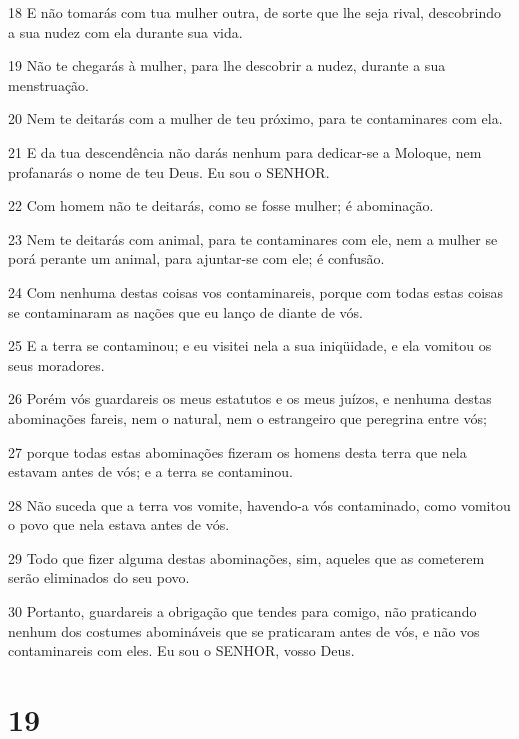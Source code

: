 \par 18 E não tomarás com tua mulher outra, de sorte que lhe seja rival, descobrindo a sua nudez com ela durante sua vida.
\par 19 Não te chegarás à mulher, para lhe descobrir a nudez, durante a sua menstruação.
\par 20 Nem te deitarás com a mulher de teu próximo, para te contaminares com ela.
\par 21 E da tua descendência não darás nenhum para dedicar-se a Moloque, nem profanarás o nome de teu Deus. Eu sou o SENHOR.
\par 22 Com homem não te deitarás, como se fosse mulher; é abominação.
\par 23 Nem te deitarás com animal, para te contaminares com ele, nem a mulher se porá perante um animal, para ajuntar-se com ele; é confusão.
\par 24 Com nenhuma destas coisas vos contaminareis, porque com todas estas coisas se contaminaram as nações que eu lanço de diante de vós.
\par 25 E a terra se contaminou; e eu visitei nela a sua iniqüidade, e ela vomitou os seus moradores.
\par 26 Porém vós guardareis os meus estatutos e os meus juízos, e nenhuma destas abominações fareis, nem o natural, nem o estrangeiro que peregrina entre vós;
\par 27 porque todas estas abominações fizeram os homens desta terra que nela estavam antes de vós; e a terra se contaminou.
\par 28 Não suceda que a terra vos vomite, havendo-a vós contaminado, como vomitou o povo que nela estava antes de vós.
\par 29 Todo que fizer alguma destas abominações, sim, aqueles que as cometerem serão eliminados do seu povo.
\par 30 Portanto, guardareis a obrigação que tendes para comigo, não praticando nenhum dos costumes abomináveis que se praticaram antes de vós, e não vos contaminareis com eles. Eu sou o SENHOR, vosso Deus.

\chapter{19}

